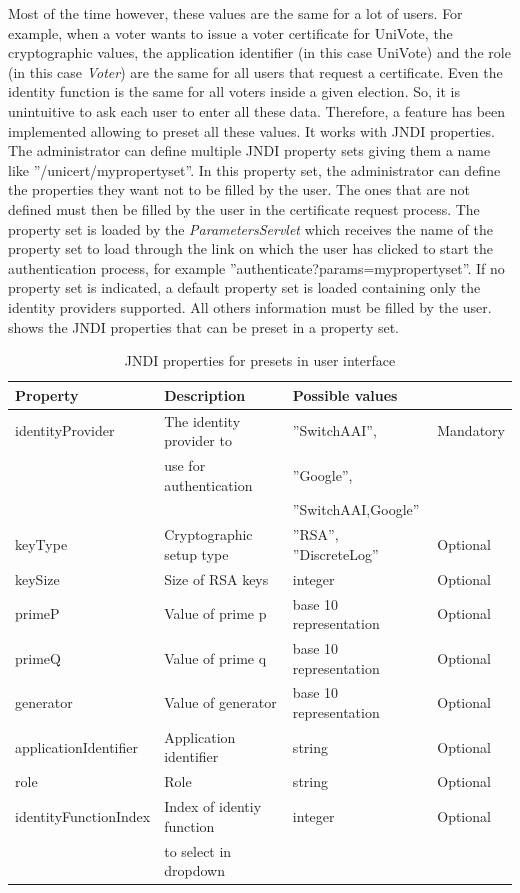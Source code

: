 \documentclass[oneside]{scrreprt}
\newcommand{\univote}{\mbox{UniVote}}
\begin{document}
Most of the time however, these values are the same for a lot of users. For example, when a voter wants to issue a voter certificate for \univote, the cryptographic values, the application identifier (in this case \univote) and the role (in this case \textit{Voter}) are the same for all users that request a certificate. Even the identity function is the same for all voters inside a given election. So, it is unintuitive to ask each user to enter all these data. Therefore, a feature has been implemented allowing to preset all these values. It works with JNDI properties. The administrator can define multiple JNDI property sets giving them a name like ''/unicert/mypropertyset''. In this property set, the administrator can define the properties they want not to be filled by the user. The ones that are not defined must then be filled by the user in the certificate request process. The property set is loaded by the \textit{ParametersServlet} which receives the name of the property set to load through the link on which the user has clicked to start the authentication process, for example ''authenticate?params=mypropertyset''. If no property set is indicated, a default property set is loaded containing only the identity providers supported. All others information must be filled by the user.  shows the JNDI properties that can be preset in a property set.

\begin{table}[ht]

\centering
\begin{tabular}{|l|l|l|l|}
  \hline
  Property & Description & Possible values & \\
  \hline
  identityProvider & The identity provider to & ''SwitchAAI'', & Mandatory\\ & use for authentication & ''Google'', & \\ & & ''SwitchAAI,Google'' & \\
  keyType & Cryptographic setup type & ''RSA'', ''DiscreteLog'' & Optional\\
  keySize & Size of RSA keys & integer & Optional\\
  primeP & Value of prime p & base 10 representation & Optional\\
  primeQ & Value of prime q & base 10 representation & Optional\\
  generator & Value of generator & base 10 representation & Optional\\
  applicationIdentifier & Application identifier & string & Optional\\
  role & Role & string & Optional\\
  identityFunctionIndex & Index of identiy function & integer & Optional\\
  & to select in dropdown & & \\
  \hline
\end{tabular}
\caption{JNDI properties for presets in user interface}
\label{t:jndi2}
\end{table}



 
\end{document}
